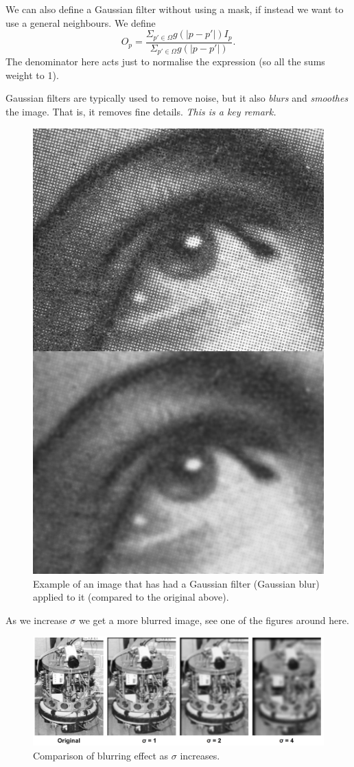 We can also define a Gaussian filter without using a mask, if instead we want to use a general neighbours. We define
\[
    O_p = \frac{\Sigma_{p' \in \Omega} g(\lvert p - p' \rvert) I_p}{\Sigma_{p' \in \Omega} g(\lvert p - p' \rvert)}.
\]
The denominator here acts just to normalise the expression (so all the sums weight to 1).

\begin{remark}
    Gaussian filters are typically used to remove noise, but it also \emph{blurs} and \emph{smoothes} the image. That is, it removes fine details. \emph{This is a key remark.}
\end{remark}

\begin{figure}
    \centering
    \includegraphics[width=0.4\linewidth]{images/gaussian-filter.jpg}
    \caption{Example of an image that has had a Gaussian filter (Gaussian blur) applied to it (compared to the original above).}
    \label{fig:gaussian-filter}
\end{figure}

\begin{remark}
    As we increase $\sigma$ we get a more blurred image, see one of the figures around here.
\end{remark}

\begin{figure}
    \centering
    \includegraphics[width=0.8\linewidth]{images/gaussian-increase-sigma.png}
    \caption{Comparison of blurring effect as $\sigma$ increases.}
    \label{fig:gaussian-increase-sigma}
\end{figure}

